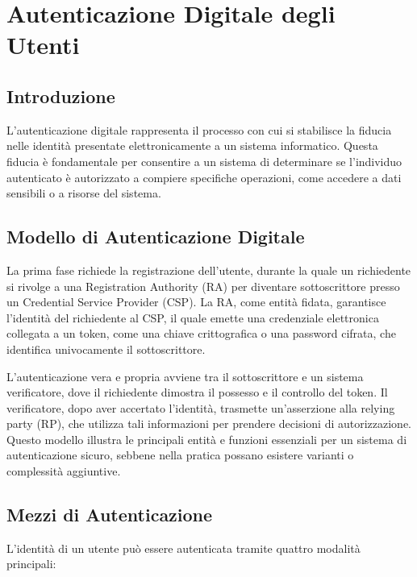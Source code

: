 \chapter{Autenticazione Digitale degli Utenti}

\section{Introduzione}

L'autenticazione digitale rappresenta il processo con cui si stabilisce la fiducia nelle identità presentate elettronicamente a un sistema informatico. Questa fiducia è fondamentale per consentire a un sistema di determinare se l'individuo autenticato è autorizzato a compiere specifiche operazioni, come accedere a dati sensibili o a risorse del sistema.

\section{Modello di Autenticazione Digitale}

La prima fase richiede la registrazione dell'utente, durante la quale un richiedente si rivolge a una Registration Authority (RA) per diventare sottoscrittore presso un Credential Service Provider (CSP). La RA, come entità fidata, garantisce l'identità del richiedente al CSP, il quale emette una credenziale elettronica collegata a un token, come una chiave crittografica o una password cifrata, che identifica univocamente il sottoscrittore.

L'autenticazione vera e propria avviene tra il sottoscrittore e un sistema verificatore, dove il richiedente dimostra il possesso e il controllo del token. Il verificatore, dopo aver accertato l'identità, trasmette un'asserzione alla relying party (RP), che utilizza tali informazioni per prendere decisioni di autorizzazione. Questo modello illustra le principali entità e funzioni essenziali per un sistema di autenticazione sicuro, sebbene nella pratica possano esistere varianti o complessità aggiuntive.

\section{Mezzi di Autenticazione}

L'identità di un utente può essere autenticata tramite quattro modalità principali:

